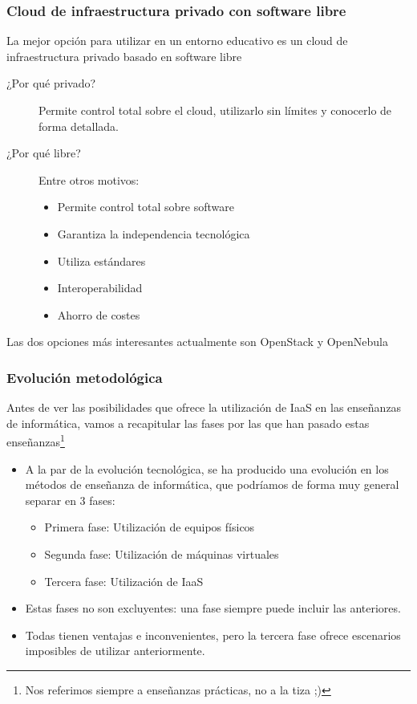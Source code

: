 \documentclass{beamer}
\begin{document}
\begin{frame}
  \frametitle{Cloud de infraestructura privado con software libre}
  La mejor opción para utilizar en un entorno educativo es un cloud de
  infraestructura privado basado en software libre
  \begin{description}
  \item[¿Por qué privado?] Permite control total sobre el cloud,
    utilizarlo sin límites y conocerlo de forma detallada.
  \item[¿Por qué libre?] Entre otros motivos:
    \begin{itemize}
    \item Permite control total sobre software
    \item Garantiza la independencia tecnológica
    \item Utiliza estándares
    \item Interoperabilidad
    \item Ahorro de costes
    \end{itemize}
  \end{description}
Las dos opciones más interesantes actualmente son OpenStack y OpenNebula
\end{frame}

\begin{frame}
  \frametitle{Evolución metodológica}
  Antes de ver las posibilidades que ofrece la utilización de IaaS en las
  enseñanzas de informática, vamos a recapitular las fases por las que han
  pasado estas enseñanzas\footnote{Nos referimos siempre a enseñanzas prácticas,
  no a la tiza ;)}
  \begin{itemize}
  \item A la par de la evolución tecnológica, se ha producido una evolución en
    los métodos de enseñanza de informática, que podríamos de forma muy general
    separar en 3 fases:
    \begin{itemize}
    \item Primera fase: Utilización de equipos físicos
    \item Segunda fase: Utilización de máquinas virtuales
    \item Tercera fase: Utilización de IaaS
    \end{itemize}
  \item Estas fases no son excluyentes: una fase siempre puede incluir las
    anteriores.
  \item Todas tienen ventajas e inconvenientes, pero la tercera fase ofrece
    escenarios imposibles de utilizar anteriormente.

  \end{itemize}
\end{frame}
\end{document}
